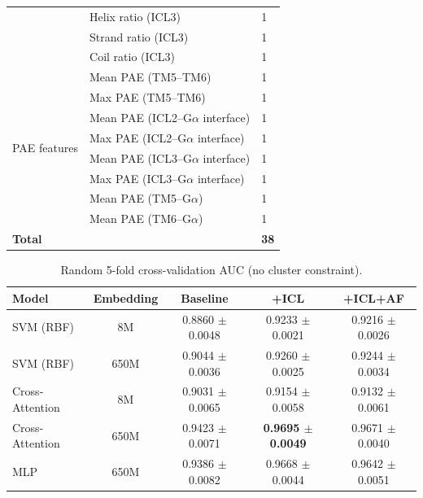 \documentclass[11pt,a4paper]{article}
\begin{document}
\begin{table}[h!]
\begin{tabular}{lll}
                             & Helix ratio (ICL3) & 1 \\
                             & Strand ratio (ICL3) & 1 \\
                             & Coil ratio (ICL3) & 1 \\
\midrule
\multirow{8}{*}{PAE features} & Mean PAE (TM5--TM6) & 1 \\
                              & Max PAE (TM5--TM6) & 1 \\
                              & Mean PAE (ICL2--G$\alpha$ interface) & 1 \\
                              & Max PAE (ICL2--G$\alpha$ interface) & 1 \\
                              & Mean PAE (ICL3--G$\alpha$ interface) & 1 \\
                              & Max PAE (ICL3--G$\alpha$ interface) & 1 \\
                              & Mean PAE (TM5--G$\alpha$) & 1 \\
                              & Mean PAE (TM6--G$\alpha$) & 1 \\
\midrule
\multicolumn{2}{l}{\textbf{Total}} & \textbf{38} \\
\bottomrule
\end{tabular}
\end{table}

\begin{table}[h!]
\centering
\caption{Random 5-fold cross-validation AUC (no cluster constraint).}
\label{tab:random_cv}
\begin{tabular}{lcccc}
\toprule
Model & Embedding & Baseline & +ICL & +ICL+AF \\
\midrule
SVM (RBF)       & 8M   & 0.8860 $\pm$ 0.0048 & 0.9233 $\pm$ 0.0021 & 0.9216 $\pm$ 0.0026 \\
SVM (RBF)       & 650M & 0.9044 $\pm$ 0.0036 & 0.9260 $\pm$ 0.0025 & 0.9244 $\pm$ 0.0034 \\
Cross-Attention & 8M   & 0.9031 $\pm$ 0.0065 & 0.9154 $\pm$ 0.0058 & 0.9132 $\pm$ 0.0061 \\
Cross-Attention & 650M & 0.9423 $\pm$ 0.0071 & \textbf{0.9695 $\pm$ 0.0049} & 0.9671 $\pm$ 0.0040 \\
MLP             & 650M & 0.9386 $\pm$ 0.0082 & 0.9668 $\pm$ 0.0044 & 0.9642 $\pm$ 0.0051 \\
\bottomrule
\end{tabular}
\end{table}
\end{document}
